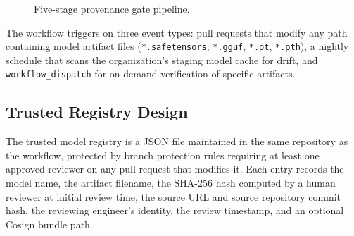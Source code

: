 \documentclass[sigconf,review]{acmart}
\begin{document}
\begin{figure}[h]
\centering
{}
\caption{Five-stage provenance gate pipeline.}
\label{fig:pipeline}
\end{figure}

The workflow triggers on three event types: pull requests that modify any
path containing model artifact files (\texttt{*.safetensors},
\texttt{*.gguf}, \texttt{*.pt}, \texttt{*.pth}), a nightly schedule that
scans the organization's staging model cache for drift, and
\texttt{workflow\_dispatch} for on-demand verification of specific artifacts.

\subsection{Trusted Registry Design}

The trusted model registry is a JSON file maintained in the same repository
as the workflow, protected by branch protection rules requiring at least
one approved reviewer on any pull request that modifies it. Each entry
records the model name, the artifact filename, the SHA-256 hash computed by
a human reviewer at initial review time, the source URL and source repository
commit hash, the reviewing engineer's identity, the review timestamp, and an
optional Cosign bundle path.
\end{document}
